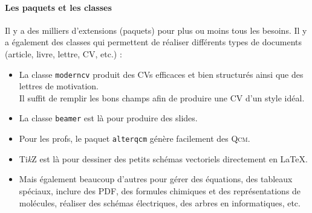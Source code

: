 \documentclass{../fiche}
\begin{document}
\paragraph{Les paquets et les classes}
Il y a des milliers d'extensions (paquets) pour plus ou moins tous les besoins. Il y a également des classes qui permettent de réaliser différents types de documents (article, livre, lettre, CV, etc.) :
\begin{itemize}
	\item La classe \texttt{moderncv} produit des CVs efficaces et bien structurés ainsi que des lettres de motivation.\\ Il suffit de remplir les bons champs afin de produire une CV d'un style idéal.
	\item La classe \texttt{beamer} est là pour produire des slides.
	\item Pour les profs, le paquet \texttt{alterqcm} génère facilement des \textsc{Qcm}.
	\item Ti\textit{k}Z est là pour dessiner des petits schémas vectoriels directement en \LaTeX{}.
	\item Mais également beaucoup d'autres pour gérer des équations, des tableaux spéciaux, inclure des PDF, des formules chimiques et des représentations de molécules, réaliser des schémas électriques, des arbres en informatiques, etc.
\end{itemize}
\end{document}
